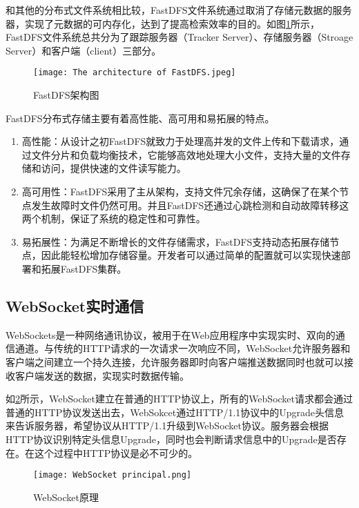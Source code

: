 和其他的分布式文件系统相比较，FastDFS文件系统通过取消了存储元数据的服务器，实现了元数据的可内存化，达到了提高检索效率的目的。如图\ref{The architecture of FastDFS}所示，FastDFS文件系统总共分为了跟踪服务器（Tracker Server）、存储服务器（Stroage Server）和客户端（client）三部分。\cite{RN06}
\begin{figure}[hbt]
    \centering
    \texttt{[image: The architecture of FastDFS.jpeg]}
    \caption{FastDFS架构图}
    \label{The architecture of FastDFS}
    \end{figure}

FastDFS分布式存储主要有着高性能、高可用和易拓展的特点。
\begin{enumerate}[label=(\arabic*)]
    \item 高性能：从设计之初FastDFS就致力于处理高并发的文件上传和下载请求，通过文件分片和负载均衡技术，它能够高效地处理大小文件，支持大量的文件存储和访问，提供快速的文件读写能力。
    \item 高可用性：FastDFS采用了主从架构，支持文件冗余存储，这确保了在某个节点发生故障时文件仍然可用。并且FastDFS还通过心跳检测和自动故障转移这两个机制，保证了系统的稳定性和可靠性。
    \item 易拓展性：为满足不断增长的文件存储需求，FastDFS支持动态拓展存储节点，因此能轻松增加存储容量。开发者可以通过简单的配置就可以实现快速部署和拓展FastDFS集群。
\end{enumerate}

\subsection{WebSocket实时通信}

WebSockets是一种网络通讯协议，被用于在Web应用程序中实现实时、双向的通信通道。\cite{EN01}与传统的HTTP请求的一次请求一次响应不同，WebSocket允许服务器和客户端之间建立一个持久连接，允许服务器即时向客户端推送数据同时也就可以接收客户端发送的数据，实现实时数据传输。

如\ref{WebSocket principal}所示，WebSocket建立在普通的HTTP协议上，所有的WebSocket请求都会通过普通的HTTP协议发送出去，WebSokcet通过HTTP/1.1协议中的Upgrade头信息来告诉服务器，希望协议从HTTP/1.1升级到WebSocket协议\cite{RN07}。服务器会根据HTTP协议识别特定头信息Upgrade，同时也会判断请求信息中的Upgrade是否存在。在这个过程中HTTP协议是必不可少的。
\begin{figure}[hbt]
    \centering
    \texttt{[image: WebSocket principal.png]}
    \caption{WebSocket原理}
    \label{WebSocket principal}
    \end{figure}

